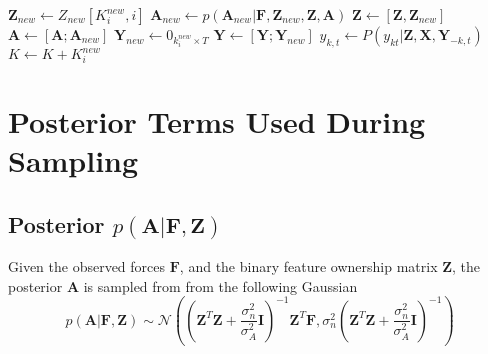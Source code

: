 \documentclass[]{article}
\begin{document}
\begin{algorithm}[H]
\begin{algorithmic}[1]
				
					\STATE $\mathbf{Z}_{new} \gets Z_{new}[K^{new}_i , i]$ \hfill  {}
					\STATE  $\mathbf{A}_{new} \gets p(\mathbf{A}_{new}| \mathbf{F}, \mathbf{Z}_{new}, \mathbf{Z}, \mathbf{A})$ \hfill {}
					\STATE $\mathbf{Z} \gets [ \mathbf{Z}, \mathbf{Z}_{new}]$\hfill {}
					\STATE $\mathbf{A} \gets [ \mathbf{A}; \mathbf{A}_{new}]$ \hfill {}
					\STATE $\mathbf{Y}_{new} \gets 0_{k^{new}_i  \times T} $  \hfill {}
					\STATE $\mathbf{Y} \gets [ \mathbf{Y}; \mathbf{Y}_{new}]$ \hfill {}
						\STATE $y_{k,t} \gets P(y_{kt}|\mathbf{Z}, \mathbf{X}, \mathbf{Y}_{-k,t})$ \hfill {}
					\ENDFOR
					\STATE $K \gets K + K^{new}_i$ 
				\ENDIF
				\vspace{0.2cm}
				
			\ENDFOR

		\ENDWHILE
	\end{algorithmic}
	\label{alg:gso}
\end{algorithm}


\newpage
\section{Posterior Terms Used During Sampling}

\subsection{Posterior $p(\mathbf{A}|\mathbf{F}, \mathbf{Z})$}
Given the observed forces $\mathbf{F}$, and the binary feature ownership matrix $\mathbf{Z}$, the posterior $\mathbf{A}$ is sampled from from the following Gaussian 
	\begin{equation}\label{eq:posterior_A}
		p(\mathbf{A}|\mathbf{F}, \mathbf{Z}) \sim \mathcal{N}\left( \left(\mathbf{Z}^T \mathbf{Z} + \frac{\sigma^2_n}{\sigma^2_A}\mathbf{I}\right)^{-1} \mathbf{Z}^T \mathbf{F} , \sigma^2_n \left(\mathbf{Z}^T \mathbf{Z} + \frac{\sigma^2_n}{\sigma^2_A}\mathbf{I}\right)^{-1}  \right)
	\end{equation}
\end{document}
